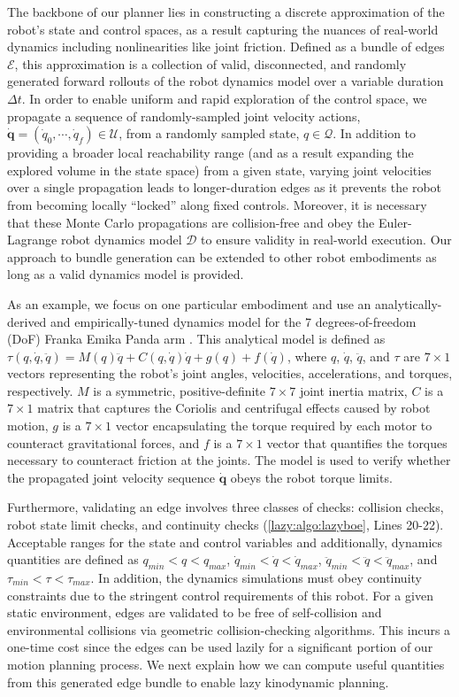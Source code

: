 The backbone of our planner lies in constructing a discrete approximation of the robot's state and control spaces, as a result capturing the nuances of real-world dynamics including nonlinearities like joint friction. Defined as a bundle of edges $\mathcal{E}$, this approximation is a collection of valid, disconnected, and randomly generated forward rollouts of the robot dynamics model over a variable duration $\Delta t$.
In order to enable uniform and rapid exploration of the control space, we propagate a sequence of randomly-sampled joint velocity actions, $\boldsymbol{\dot{q}} = (\dot{q}_0, \cdots, \dot{q}_f) \in \mathcal{U}$, from a randomly sampled state, $q \in \mathcal{Q}$. In addition to providing a broader local reachability range (and as a result expanding the explored volume in the state space) from a given state, varying joint velocities over a single propagation leads to longer-duration edges as it prevents the robot from becoming locally ``locked'' along fixed controls.
Moreover, it is necessary that these Monte Carlo propagations are collision-free and obey the Euler-Lagrange robot dynamics model $\mathcal{D}$ to ensure validity in real-world execution. Our approach to bundle generation can be extended to other robot embodiments as long as a valid dynamics model is provided.

As an example, we focus on one particular embodiment and use an analytically-derived and empirically-tuned dynamics model for the 7 degrees-of-freedom (DoF) Franka Emika Panda arm \cite{Gaz2019}. This analytical model is defined as
$\tau(q, \dot{q}, \ddot{q}) = M(q)\ddot{q} + C(q, \dot{q})\dot{q} + g(q) + f(\dot{q})$,
where $q$, $\dot{q}$, $\ddot{q}$, and $\tau$ are $7\times1$ vectors representing the robot's joint angles, velocities, accelerations, and torques, respectively. $M$ is a symmetric, positive-definite $7\times7$ joint inertia matrix, $C$ is a $7\times1$ matrix that captures the Coriolis and centrifugal effects caused by robot motion, $g$ is a $7\times1$ vector encapsulating the torque required by each motor to counteract gravitational forces, and $f$ is a $7\times1$ vector that quantifies the torques necessary to counteract friction at the joints. The model is used to verify whether the propagated joint velocity sequence $\boldsymbol{\dot{q}}$ obeys the robot torque limits.

Furthermore, validating an edge involves three classes of checks: collision checks, robot state limit checks, and continuity checks (\cref{lazy:algo:lazyboe}, Lines 20-22).
Acceptable ranges for the state and control variables and additionally, dynamics quantities are defined as $q_{min} < q < q_{max}$, $\dot{q}_{min} < \dot{q} < \dot{q}_{max}$, $\ddot{q}_{min} < \ddot{q} < \ddot{q}_{max}$, and $\tau_{min} < \tau < \tau_{max}$.
In addition, the dynamics simulations must obey continuity constraints due to the stringent control requirements of this robot.
For a given static environment, edges are validated to be free of self-collision and environmental collisions via geometric collision-checking algorithms. This incurs a one-time cost since the edges can be used lazily for a significant portion of our motion planning process.
We next explain how we can compute useful quantities from this generated edge bundle to enable lazy kinodynamic planning.

